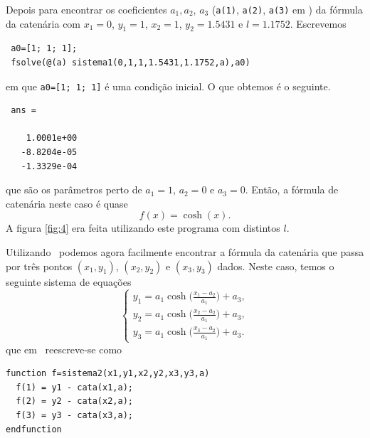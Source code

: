 Depois para encontrar os coeficientes $a_1, a_2$, $a_3$ (\verb|a(1)|,
\verb|a(2)|, \verb|a(3)| em \Octave) da fórmula da catenária com $x_1=0$, $y_1=1$, $x_2=1$, $y_2=1.5431$ e $l=1.1752$.
Escrevemos
\begin{octaveboxI}
{\small
\begin{verbatim}
 a0=[1; 1; 1];
 fsolve(@(a) sistema1(0,1,1,1.5431,1.1752,a),a0)
\end{verbatim}}
\end{octaveboxI}
\noindent em que \verb|a0=[1; 1; 1]| é uma condição inicial. O que obtemos é o seguinte.
\begin{octaveboxI}
\begin{verbatim}
 ans =

    1.0001e+00
   -8.8204e-05
   -1.3329e-04
\end{verbatim}
\end{octaveboxI}
que são os parâmetros perto de $a_1=1$, $a_2=0$ e $a_3=0$. Então, a fórmula de catenária neste caso é quase
\begin{displaymath}
  f(x)=\cosh(x).
\end{displaymath}
A figura \ref{fig:4} era feita utilizando este programa com distintos
$l$.

Utilizando \Octave\  podemos agora facilmente encontrar a fórmula da catenária que passa por três pontos $(x_1,y_1)$, $(x_2,y_2)$ e $(x_3,y_3)$ dados. Neste caso, temos o seguinte sistema de equações
\begin{displaymath}
  \left\{
    \begin{array}{l}
      y_1=a_1\cosh\Big(\frac{x_1-a_2}{a_1}\Big) + a_3,\\
      y_2=a_1\cosh\Big(\frac{x_2-a_2}{a_1}\Big) + a_3,\\
      y_3=a_1\cosh\Big(\frac{x_3-a_2}{a_1}\Big) + a_3.
    \end{array}
  \right.
\end{displaymath}
que em \Octave\ reescreve-se como
\begin{octavebox}
\begin{verbatim}
function f=sistema2(x1,y1,x2,y2,x3,y3,a)
  f(1) = y1 - cata(x1,a);
  f(2) = y2 - cata(x2,a);
  f(3) = y3 - cata(x3,a);
endfunction
\end{verbatim}
\end{octavebox}

